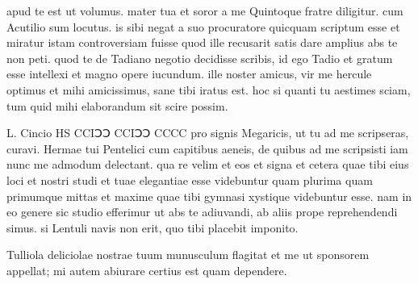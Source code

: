 


 apud te est ut volumus. mater tua et soror a me Quintoque fratre diligitur. cum Acutilio sum locutus. is sibi negat a suo procuratore quicquam scriptum esse et miratur istam controversiam fuisse quod ille recusarit satis dare amplius abs te non peti. quod te de Tadiano negotio decidisse scribis, id ego Tadio et gratum esse intellexi et magno opere iucundum. ille noster amicus, vir me hercule optimus et mihi amicissimus, sane tibi iratus est. hoc si quanti tu aestimes sciam, tum quid mihi elaborandum sit scire possim.

 L. Cincio HS CCIↃↃ CCIↃↃ CCCC pro signis Megaricis, ut tu ad me scripseras, curavi. Hermae tui Pentelici cum capitibus aeneis, de quibus ad me scripsisti iam nunc me admodum delectant. qua re velim et eos et signa et cetera quae tibi eius loci et nostri studi et tuae elegantiae esse videbuntur quam plurima quam primumque mittas et maxime quae tibi gymnasi xystique videbuntur esse. nam in eo genere sic studio efferimur ut abs te adiuvandi, ab aliis prope reprehendendi simus. si Lentuli navis non erit, quo tibi placebit imponito.

 Tulliola deliciolae nostrae tuum munusculum flagitat et me ut sponsorem appellat; mi autem abiurare certius est quam dependere.
